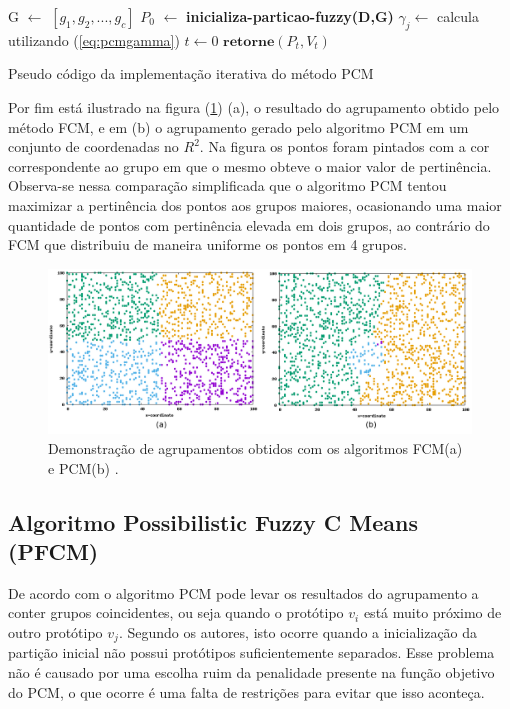 \begin{algorithm}[H] 
  \SetAlgoLined {} 
  G $\gets$ $[g_1,g_2,...,g_c]$\; 
  $P_0$ $\gets$ \textbf{{\color{blue}inicializa-particao-fuzzy}(D,G)}\; 
  $\gamma_j \gets$ calcula utilizando (\ref{eq:pcmgamma})\;
  $t \gets 0$\; 
  $\textbf{retorne} (P_t, V_t)$\; 
  \caption{Pseudo código da implementação iterativa do método PCM}
  \label{alg:pcm} 
\end{algorithm}
Por fim está ilustrado na figura (\ref{fig:samples_pcm_fcm}) (a), o resultado do agrupamento
obtido pelo método FCM, e em (b) o agrupamento gerado pelo algoritmo PCM em um conjunto de 
coordenadas no $R^2$. Na figura os pontos foram pintados com a cor correspondente ao grupo em que o 
mesmo obteve o maior valor de pertinência. Observa-se nessa comparação simplificada que o algoritmo 
PCM tentou maximizar a pertinência dos pontos aos grupos maiores, ocasionando uma maior quantidade
de pontos com pertinência elevada em dois grupos, ao contrário do FCM que distribuiu de maneira
uniforme os pontos em 4 grupos.

\begin{figure}[!htp] 
  \centering 
  \includegraphics[width=0.8\columnwidth]{assets/samples_pcm_fcm.png}
  \caption{Demonstração de agrupamentos obtidos com os algoritmos 
    FCM\protect\footnotemark (a) e PCM\protect\footnotemark[\value{footnote}](b)
  .} 
  \label{fig:samples_pcm_fcm} 
\end{figure}

\subsection{Algoritmo Possibilistic Fuzzy C Means (PFCM)} 
De acordo com \cite{Pal2005} o algoritmo PCM pode levar os resultados do agrupamento 
a conter grupos coincidentes, ou seja quando o protótipo $v_i$ está muito próximo de outro protótipo
$v_j$. Segundo os autores, isto ocorre quando a inicialização da partição inicial não possui 
protótipos
suficientemente separados. Esse problema não é causado por uma escolha ruim da penalidade presente
na função objetivo do PCM, o que ocorre é uma falta de restrições para evitar que isso aconteça.

